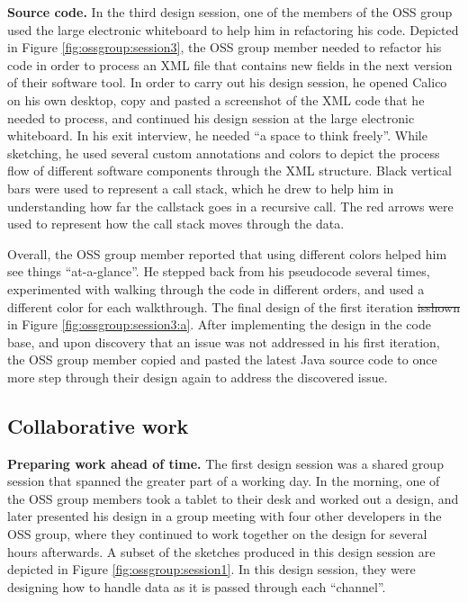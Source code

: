 \documentclass[12pt,fleqn]{ucithesis}
\providecommand{\DIFaddtex}[1]{{\protect\color{blue}\uwave{#1}}} %
\providecommand{\DIFdeltex}[1]{{\protect\color{red}\sout{#1}}}                      %
\providecommand{\DIFaddbegin}{} %
\providecommand{\DIFaddend}{} %
\providecommand{\DIFdelbegin}{} %
\providecommand{\DIFdelend}{} %
\providecommand{\DIFadd}[1]{\texorpdfstring{\DIFaddtex{#1}}{#1}} %
\providecommand{\DIFdel}[1]{\texorpdfstring{\DIFdeltex{#1}}{}} %
\begin{document}
\textbf{Source code. } In the third design session, one of the members of the OSS group used the large electronic whiteboard to help him in refactoring his code. Depicted in Figure \ref{fig:ossgroup:session3}, the OSS group member needed to refactor his code in order to process an XML file that contains new fields in the next version of their software tool. In order to carry out his design session, he opened Calico on his own desktop, copy and pasted a screenshot of the XML code that he needed to process, and continued his design session at the large electronic whiteboard. In his exit interview, he needed ``a space to think freely''. While sketching, he used several custom annotations and colors to depict the process flow of different software components through the XML structure. Black vertical bars were used to represent a call stack, which he drew to help him in understanding how far the callstack goes in a recursive call. The red arrows were used to represent how the call stack moves through the data.

Overall, the OSS group member reported that using different colors helped him see things ``at-a-glance''. He stepped back from his pseudocode several times, experimented with walking through the code in different orders, and used a different color for each walkthrough. The final design of the first iteration \DIFdelbegin \DIFdel{isshown }\DIFdelend \DIFaddbegin \DIFadd{is shown }\DIFaddend in Figure \ref{fig:ossgroup:session3:a}. After implementing the design in the code base, and upon discovery that an issue was not addressed in his first iteration, the OSS group member copied and pasted the latest Java source code to once more step through their design again to address the discovered issue.

\subsection{Collaborative work}

\textbf{Preparing work ahead of time.} The first design session was a shared group session that spanned the greater part of a working day. In the morning, one of the OSS group members took a tablet to their desk and worked out a design, and later presented his design in a group meeting with four other developers in the OSS group, where they continued to work together on the design for several hours afterwards. A subset of the sketches produced in this design session are depicted in Figure \ref{fig:ossgroup:session1}. In this design session, they were designing how to handle data as it is passed through each ``channel''.
\end{document}

